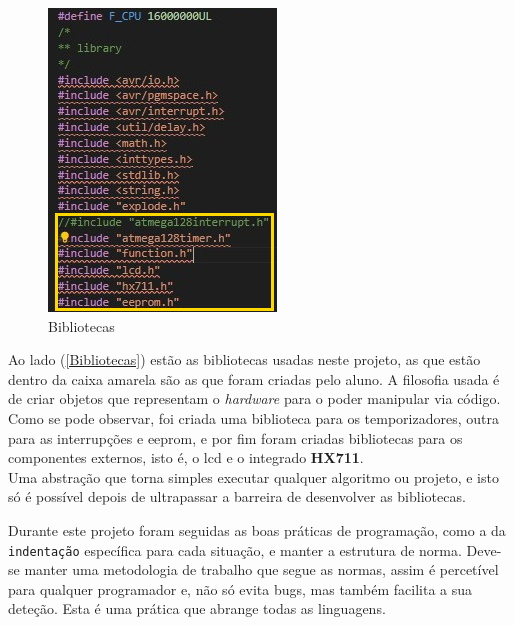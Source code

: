 \begin{minipage}{.40\linewidth}
	\begin{figure}[H]
		\flushleft
		\captionsetup{justification=raggedright,singlelinecheck=false}
		\includegraphics[scale=0.9]{./image/PESTA/Code/Livrarias.jpg}
		\caption{Bibliotecas}
		\label{Bibliotecas}
	\end{figure}
\end{minipage}
\hspace{2pt}
\begin{minipage}{.6\linewidth}
	Ao lado (\autoref{Bibliotecas}) estão as bibliotecas usadas neste projeto, as que estão dentro da caixa amarela são as que foram criadas pelo aluno.
	A filosofia usada é de criar objetos que representam o \textit{hardware} para o poder manipular via código. Como se pode observar, foi criada uma biblioteca para os temporizadores, outra para as interrupções e \ac{eeprom}, e por fim foram criadas bibliotecas para os componentes externos, isto é, o \acs{lcd} e o integrado \textbf{HX711}.\\
Uma abstração que torna simples executar qualquer algoritmo ou projeto, e isto só é possível depois de ultrapassar a barreira de desenvolver as bibliotecas.
\end{minipage}
Durante este projeto foram seguidas as boas práticas de programação, como a da \texttt{indentação} específica para cada situação, e manter a estrutura de norma. Deve-se manter uma metodologia de trabalho que segue as normas, assim é percetível para qualquer programador e, não só evita bugs, mas também facilita a sua deteção. Esta é uma prática que abrange todas as linguagens.
